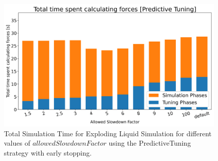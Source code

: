 \documentclass[conference]{IEEEtran}
\begin{document}
\begin{figure}[H]
    \centering

    \includegraphics[width=\columnwidth]{../data/explodingLiquid/cluster/predictiveTuning/analytics/total_time_average.png}

    \caption{Total Simulation Time for Exploding Liquid Simulation for different values of $allowedSlowdownFactor$ using the PredictiveTuning strategy with early stopping.}
    \label{fig:predictive_tuning}
\end{figure}
\end{document}
